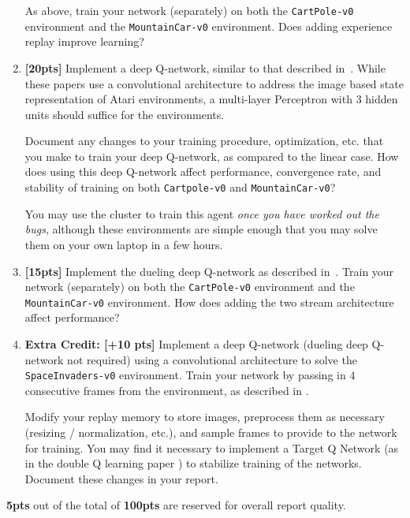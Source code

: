 \documentclass[12pt]{article}
\begin{document}
\begin{enumerate}
    As above, train your network (separately) on both the \texttt{CartPole-v0} environment and the \texttt{MountainCar-v0} environment. Does adding experience replay improve learning? 
             
	\item \textbf{[20pts]} Implement a deep Q-network, similar to that described in~\cite{mnih2013playing, mnih2015human}. While these papers use a convolutional architecture to address the image based state representation of Atari environments, a multi-layer Perceptron with $3$ hidden units should suffice for the environments. 
	
	Document any changes to your training procedure, optimization, etc. that you make to train your deep Q-network, as compared to the linear case. How does using this deep Q-network affect performance, convergence rate, and stability of training on both \texttt{Cartpole-v0} and \texttt{MountainCar-v0}?
	
	You may use the cluster to train this agent \textit{once you have worked out the bugs}, although these environments are simple enough that you may solve them on your own laptop in a few hours. 
	
    \item \textbf{[15pts]} Implement the dueling deep Q-network as described in~\cite{wang2015dueling}.
    Train your network (separately) on both the \texttt{CartPole-v0} environment and the \texttt{MountainCar-v0} environment. How does adding the two stream architecture affect performance? 
    
    \item \textbf{Extra Credit: [+10 pts]}  Implement a deep Q-network (dueling deep Q-network not required) using a convolutional architecture to solve the \texttt{SpaceInvaders-v0} environment. Train your network by passing in $4$ consecutive frames from the environment, as described in \cite{mnih2015human, mnih2013playing}. 
    
    Modify your replay memory to store images, preprocess them as necessary (resizing / normalization, etc.), and sample frames to provide to the network for training. You may find it necessary to implement a Target Q Network (as in the double Q learning paper \cite{van2016deep}) to stabilize training of the networks. Document these changes in your report.
    
    
\end{enumerate}

\noindent
\textbf{5pts} out of the total of \textbf{100pts} are reserved for overall report quality.
\end{document}
